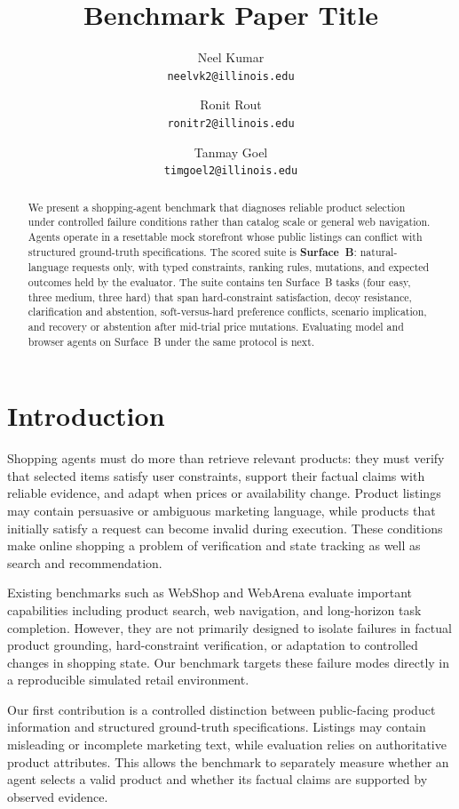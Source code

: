 \documentclass{article} %
\title{Benchmark Paper Title}
\author{Neel Kumar \\ \texttt{neelvk2@illinois.edu} \and Ronit Rout \\ \texttt{ronitr2@illinois.edu} \and Tanmay Goel \\ \texttt{timgoel2@illinois.edu}}
\begin{document}
\maketitle

\begin{abstract}
We present a shopping-agent benchmark that diagnoses reliable product selection under controlled failure conditions rather than catalog scale or general web navigation. Agents operate in a resettable mock storefront whose public listings can conflict with structured ground-truth specifications. The scored suite is \textbf{Surface~B}: natural-language requests only, with typed constraints, ranking rules, mutations, and expected outcomes held by the evaluator. The suite contains ten Surface~B tasks (four easy, three medium, three hard) that span hard-constraint satisfaction, decoy resistance, clarification and abstention, soft-versus-hard preference conflicts, scenario implication, and recovery or abstention after mid-trial price mutations. Evaluating model and browser agents on Surface~B under the same protocol is next.
\end{abstract}

\section{Introduction}
\label{sec:intro}


Shopping agents must do more than retrieve relevant products: they must verify that selected items satisfy user constraints, support their factual claims with reliable evidence, and adapt when prices or availability change. Product listings may contain persuasive or ambiguous marketing language, while products that initially satisfy a request can become invalid during execution. These conditions make online shopping a problem of verification and state tracking as well as search and recommendation.

Existing benchmarks such as WebShop and WebArena evaluate important capabilities including product search, web navigation, and long-horizon task completion. However, they are not primarily designed to isolate failures in factual product grounding, hard-constraint verification, or adaptation to controlled changes in shopping state. Our benchmark targets these failure modes directly in a reproducible simulated retail environment.

Our first contribution is a controlled distinction between public-facing product information and structured ground-truth specifications. Listings may contain misleading or incomplete marketing text, while evaluation relies on authoritative product attributes. This allows the benchmark to separately measure whether an agent selects a valid product and whether its factual claims are supported by observed evidence.
\end{document}
